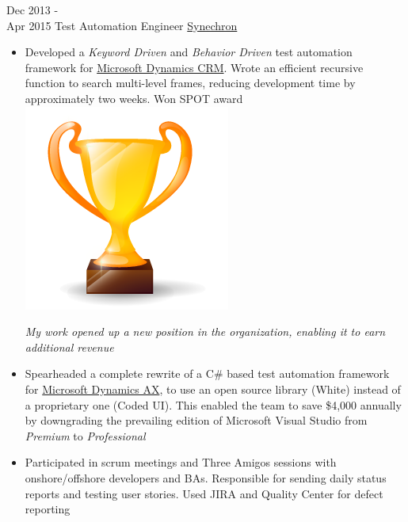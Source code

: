 \documentclass[letterpaper]{twentysecondcv} %
\begin{document}
\begin{twenty}
     \twentyitem
   		{Dec 2013 - \\ Apr 2015}
        {Test Automation Engineer}
        {\href{http://www.synechron.com/}{Synechron}}
        {}
        {
        \begin{itemize}
        \item Developed a \textit{Keyword Driven} and \textit{Behavior Driven} test automation framework for \href{https://www.microsoft.com/en-ca/dynamics/crm.aspx}{Microsoft Dynamics CRM}. Wrote an efficient recursive function to search multi-level frames, reducing development time by approximately two weeks. Won SPOT award {\includegraphics[scale=0.05]{img/trophy.png}}
        
        \textit{My work opened up a new position in the organization, enabling it to earn additional revenue}
        \item Spearheaded a complete rewrite of a C\# based test automation framework for \href{https://www.microsoft.com/en-ca/dynamics/erp-ax-overview.aspx}{Microsoft Dynamics AX}, to use an open source library (White) instead of a proprietary one (Coded UI). This enabled the team to save \$4,000 annually by downgrading the prevailing edition of Microsoft Visual Studio from \textit{Premium} to \textit{Professional}
        \item Participated in scrum meetings and Three Amigos sessions with onshore/offshore developers and BAs. Responsible for sending daily status reports and testing user stories. Used JIRA and Quality Center for defect reporting
    \end{itemize}
    	}
        
\end{twenty}
\end{document}
